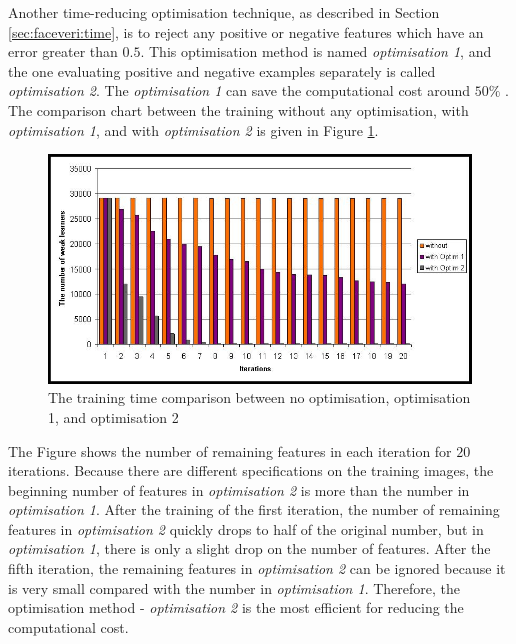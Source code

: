 Another time-reducing optimisation technique, as described in \mbox{Section} \ref{sec:faceveri:time}, is to reject any positive or negative features which have an error greater than $0.5$. This optimisation method is named \textit{optimisation 1}, and the one evaluating positive and negative examples separately is called \textit{optimisation 2}. The \textit{optimisation 1} can save the computational cost around $50\%$ \cite{zhou2006icpr}. The comparison chart between the training without any optimisation, with \textit{optimisation 1}, and with \textit{optimisation 2} is given in \mbox{Figure} \ref{fig:comparisono1o2wo}. 
\begin{figure}[ht]
 \includegraphics[width=\columnwidth]{ch5/figures/comparisono1o2wo.jpg}
\caption{The training time comparison between no optimisation, optimisation 1, and optimisation 2}
\label{fig:comparisono1o2wo}
\end{figure} 
The \mbox{Figure} shows the number of remaining features in each iteration for $20$ iterations. Because there are different specifications on the training images, the beginning number of features in \textit{optimisation 2} is more than the number in \textit{optimisation 1}. After the training of the first iteration, the number of remaining features in \textit{optimisation 2} quickly drops to half of the original number, but in \textit{optimisation 1}, there is only a slight drop on the number of features. After the fifth iteration, the remaining features in \textit{optimisation 2} can be ignored because it is very small compared with the number in \textit{optimisation 1}. Therefore, the optimisation method - \textit{optimisation 2} is the most efficient for reducing the computational cost.

